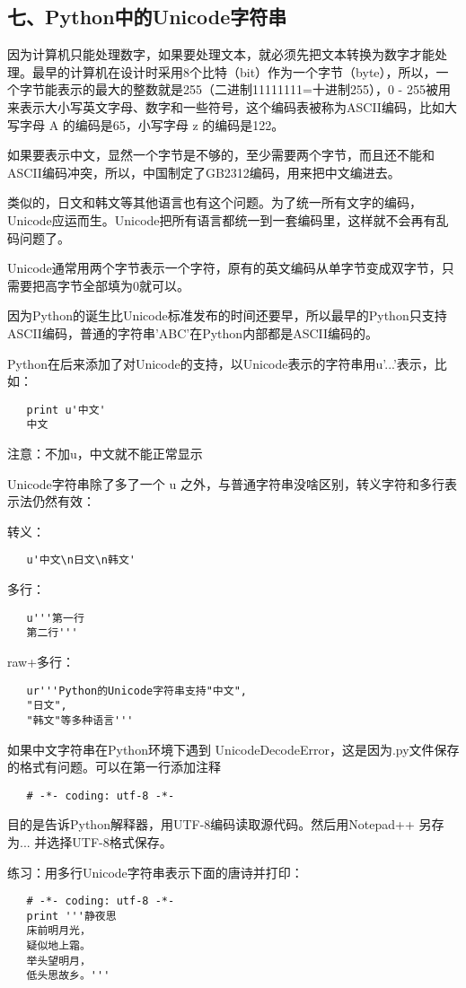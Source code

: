 \documentclass{article}
\begin{document}
\begin{CJK}{UTF8}{gbsn}
\part*{七、Python中的Unicode字符串}
\subparagraph*{}
因为计算机只能处理数字，如果要处理文本，就必须先把文本转换为数字才能处理。最早的计算机在设计时采用8个比特（bit）作为一个字节（byte），所以，一个字节能表示的最大的整数就是255（二进制11111111=十进制255），0 - 255被用来表示大小写英文字母、数字和一些符号，这个编码表被称为ASCII编码，比如大写字母 A 的编码是65，小写字母 z 的编码是122。
\subparagraph*{}
如果要表示中文，显然一个字节是不够的，至少需要两个字节，而且还不能和ASCII编码冲突，所以，中国制定了GB2312编码，用来把中文编进去。
\subparagraph*{}
类似的，日文和韩文等其他语言也有这个问题。为了统一所有文字的编码，Unicode应运而生。Unicode把所有语言都统一到一套编码里，这样就不会再有乱码问题了。
\subparagraph*{}
Unicode通常用两个字节表示一个字符，原有的英文编码从单字节变成双字节，只需要把高字节全部填为0就可以。
\subparagraph*{}
因为Python的诞生比Unicode标准发布的时间还要早，所以最早的Python只支持ASCII编码，普通的字符串'ABC'在Python内部都是ASCII编码的。
\subparagraph*{}
Python在后来添加了对Unicode的支持，以Unicode表示的字符串用u'...'表示，比如：
\begin{verbatim}
   print u'中文'
   中文
\end{verbatim}
\subparagraph*{}
注意：不加u，中文就不能正常显示
\subparagraph*{}
Unicode字符串除了多了一个 u 之外，与普通字符串没啥区别，转义字符和多行表示法仍然有效：
\subparagraph*{}
转义：
\begin{verbatim}
   u'中文\n日文\n韩文'
\end{verbatim}
\subparagraph*{}
多行：
\begin{verbatim}
   u'''第一行
   第二行'''
\end{verbatim}
\subparagraph*{}
raw+多行：
\begin{verbatim}
   ur'''Python的Unicode字符串支持"中文",
   "日文",
   "韩文"等多种语言'''
\end{verbatim}
\subparagraph*{}
如果中文字符串在Python环境下遇到 UnicodeDecodeError，这是因为.py文件保存的格式有问题。可以在第一行添加注释
\begin{verbatim}
   # -*- coding: utf-8 -*-
\end{verbatim}
\subparagraph*{}
目的是告诉Python解释器，用UTF-8编码读取源代码。然后用Notepad++ 另存为... 并选择UTF-8格式保存。
\subparagraph*{}
练习：用多行Unicode字符串表示下面的唐诗并打印：
\begin{verbatim}
   # -*- coding: utf-8 -*-
   print '''静夜思
   床前明月光，
   疑似地上霜。
   举头望明月，
   低头思故乡。'''
\end{verbatim}

\end{CJK}
\end{document}
